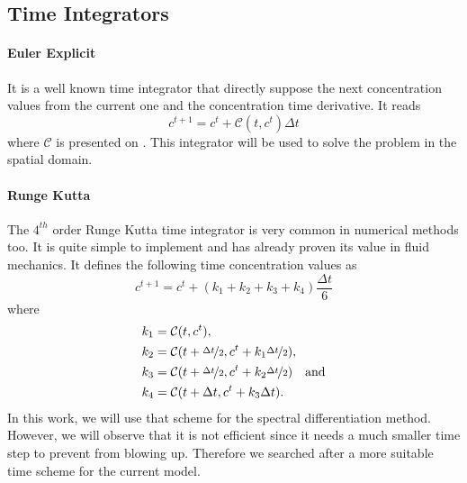 \documentclass[10pt,a4paper,twocolumn]{article}
\begin{document}
\subsection{Time Integrators} %
\label{sub:time_integrators}

\paragraph{Euler Explicit} It is a well known time integrator that directly suppose the next concentration values from the current one and the concentration time derivative. It reads
\begin{equation}
	c^{t+1} = c^t + \mathcal C(t,c^t) \Delta t
\end{equation}
where $\mathcal C$ is presented on . This integrator will be used to solve the problem in the spatial domain.

\paragraph{Runge Kutta} The $4^{th}$ order Runge Kutta time integrator is very common in numerical methods too. It is quite simple to implement and has already proven its value in fluid mechanics. It defines the following time concentration values as
\begin{equation}
	c^{t+1} = c^t + (k_1 + k_2 + k_3 + k_4) \frac{\Delta t}{6}
\end{equation}
where
\begin{align*}
	k_1 &= \mathcal C(t, c^t), \\
	k_2 &= \mathcal C(t + \nicefrac{\Delta t}{2}, c^t + k_1 \nicefrac{\Delta t}{2}), \\
	k_3 &= \mathcal C(t + \nicefrac{\Delta t}{2}, c^t + k_2 \nicefrac{\Delta t}{2})\quad\text{and} \\
	k_4 &= \mathcal C(t + \Delta t, c^t + k_3 \Delta t).
\end{align*}
In this work, we will use that scheme for the spectral differentiation method. However, we will observe that it is not efficient since it needs a much smaller time step to prevent from blowing up. Therefore we searched after a more suitable time scheme for the current model.
\end{document}
